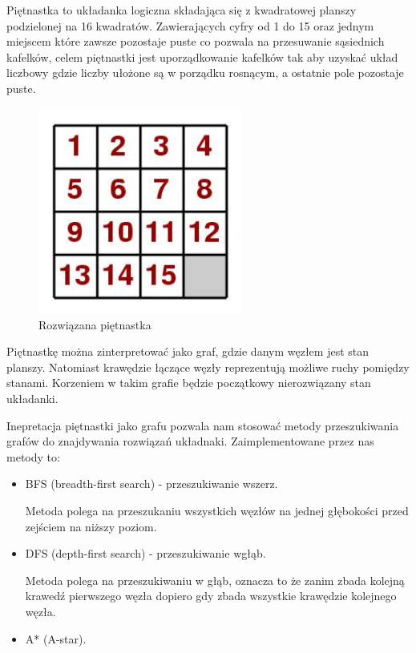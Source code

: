 \documentclass{classrep}
\begin{document}
    {
        Piętnastka to układanka logiczna składająca się z kwadratowej
        planszy podzielonej na 16 kwadratów. Zawierających cyfry od 1 do 15 oraz jednym miejscem które zawsze pozostaje puste
        co pozwala na przesuwanie sąsiednich kafelków, celem piętnastki jest uporządkowanie kafelków tak aby uzyskać układ liczbowy
        gdzie liczby ułożone są w porządku rosnącym, a ostatnie pole pozostaje puste.

        \begin{figure}[!ht]
            \centering
            \includegraphics[width=0.6\textwidth,keepaspectratio]
            {15}
            \caption{Rozwiązana piętnastka}
            \label{fig:Rozwiązana piętnastka}
        \end{figure}

        Piętnastkę można zinterpretować jako graf, gdzie danym węzłem jest stan planszy. Natomiast krawędzie łączące węzły
    reprezentują możliwe ruchy pomiędzy stanami. Korzeniem w takim grafie będzie początkowy nierozwiązany stan układanki.

    Inepretacja piętnastki jako grafu pozwala nam stosować metody przeszukiwania grafów do znajdywania rozwiązań układnaki.
    Zaimplementowane przez nas metody to:
        \begin{itemize}
            \item BFS (breadth-first search) - przeszukiwanie wszerz.

            Metoda polega na przeszukaniu wszystkich węzłów na jednej głębokości przed zejściem na niższy poziom.
            \item DFS (depth-first search) - przeszukiwanie wgłąb.

            Metoda polega na przeszukiwaniu w głąb, oznacza to że zanim zbada kolejną krawedź pierwszego węzła
            dopiero gdy zbada wszystkie krawędzie kolejnego węzła.
            \item A* (A-star).


\end{itemize}}
\end{document}

